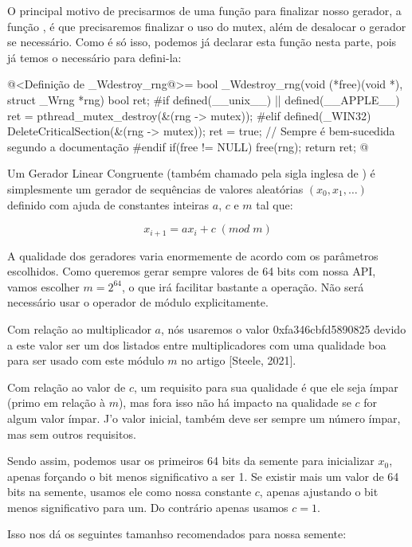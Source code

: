 O principal motivo de precisarmos de uma função para finalizar nosso
gerador, a função , é que precisaremos
finalizar o uso do mutex, além de desalocar o gerador se
necessário. Como é só isso, podemos já declarar esta função nesta
parte, pois já temos o necessário para defini-la:

\iniciocodigo
@<Definição de \_Wdestroy\_rng@>=
bool _Wdestroy_rng(void (*free)(void *), struct _Wrng *rng){
  bool ret;
#if defined(__unix__) || defined(__APPLE__)
  ret = pthread_mutex_destroy(&(rng -> mutex));
#elif defined(_WIN32)
  DeleteCriticalSection(&(rng -> mutex));
  ret = true; // Sempre é bem-sucedida segundo a documentação
#endif
  if(free != NULL)
    free(rng);
  return ret;
}
@
\fimcodigo



Um Gerador Linear Congruente (também chamado pela sigla inglesa
de ) é simplesmente um gerador de
sequências de valores aleatórias $(x_0, x_1, \ldots)$ definido com
ajuda de constantes inteiras $a$, $c$ e $m$ tal que:

$$
x_{i+1}=ax_i+c\; (mod\; m)
$$

A qualidade dos geradores varia enormemente de acordo com os
parâmetros escolhidos. Como queremos gerar sempre valores de 64 bits
com nossa API, vamos escolher $m=2^{64}$, o que irá facilitar bastante
a operação. Não será necessário usar o operador de módulo
explicitamente.

Com relação ao multiplicador $a$, nós usaremos o valor
0xfa346cbfd5890825 devido a este valor ser um dos listados entre
multiplicadores com uma qualidade boa para ser usado com este módulo
$m$ no artigo [Steele, 2021].

Com relação ao valor de $c$, um requisito para sua qualidade é que ele
seja ímpar (primo em relação à $m$), mas fora isso não há impacto na
qualidade se $c$ for algum valor ímpar. J'o valor inicial, também deve
ser sempre um número ímpar, mas sem outros requisitos.

Sendo assim, podemos usar os primeiros 64 bits da semente para
inicializar $x_0$, apenas forçando o bit menos significativo a ser
1. Se existir mais um valor de 64 bits na semente, usamos ele como
nossa constante $c$, apenas ajustando o bit menos significativo para
um. Do contrário apenas usamos $c=1$.

Isso nos dá os seguintes tamanhso recomendados para nossa semente:


